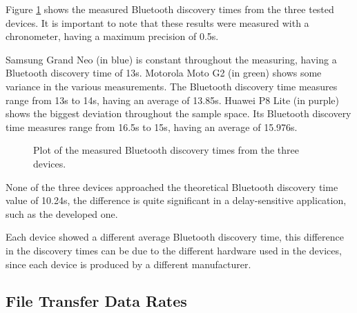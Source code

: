 Figure \ref{fig:normaldisc} shows the measured Bluetooth discovery times from the three tested devices. It is important to note that these results were measured with a chronometer, having a maximum precision of 0.5s.

Samsung Grand Neo (in blue) is constant throughout the measuring, having a Bluetooth discovery time of 13s. Motorola Moto G2 (in green) shows some variance in the various measurements. The Bluetooth discovery time measures range from 13s to 14s, having an average of 13.85s. Huawei P8 Lite (in purple) shows the biggest deviation throughout the sample space. Its Bluetooth discovery time measures range from 16.5s to 15s, having an average of 15.976s.

\begin{figure}[ht]
	\noindent{}
	\caption{\label{fig:normaldisc} Plot of the measured Bluetooth discovery times from the three devices.}
\end{figure}

None of the three devices approached the theoretical Bluetooth discovery time value of 10.24s, the difference is quite significant in a delay-sensitive application, such as the developed one.

Each device showed a different average Bluetooth discovery time, this difference in the discovery times can be due to the different hardware used in the devices, since each device is produced by a different manufacturer.

\subsection{File Transfer Data Rates}
\label{subsec:normalftdr}

